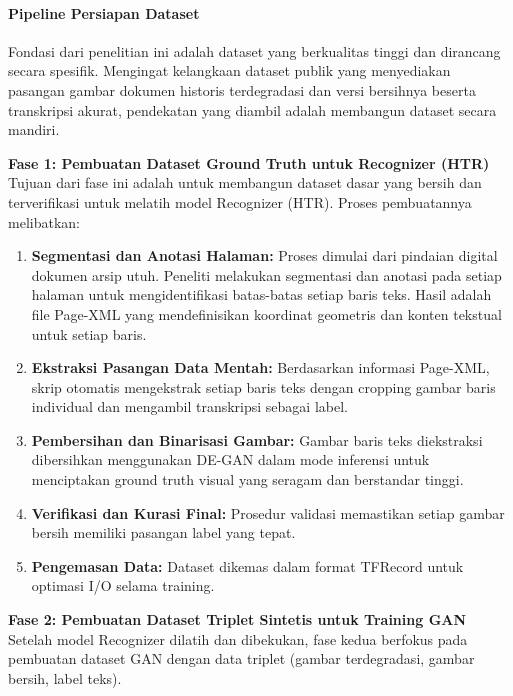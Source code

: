 \documentclass[12pt,a4paper]{article}
\begin{document}
\paragraph{Pipeline Persiapan Dataset}
Fondasi dari penelitian ini adalah dataset yang berkualitas tinggi dan dirancang secara spesifik. Mengingat kelangkaan dataset publik yang menyediakan pasangan gambar dokumen historis terdegradasi dan versi bersihnya beserta transkripsi akurat, pendekatan yang diambil adalah membangun dataset secara mandiri.

\textbf{Fase 1: Pembuatan Dataset Ground Truth untuk Recognizer (HTR)}
Tujuan dari fase ini adalah untuk membangun dataset dasar yang bersih dan terverifikasi untuk melatih model Recognizer (HTR). Proses pembuatannya melibatkan:

\begin{enumerate}
    \item \textbf{Segmentasi dan Anotasi Halaman:} Proses dimulai dari pindaian digital dokumen arsip utuh. Peneliti melakukan segmentasi dan anotasi pada setiap halaman untuk mengidentifikasi batas-batas setiap baris teks. Hasil adalah file Page-XML yang mendefinisikan koordinat geometris dan konten tekstual untuk setiap baris.

    \item \textbf{Ekstraksi Pasangan Data Mentah:} Berdasarkan informasi Page-XML, skrip otomatis mengekstrak setiap baris teks dengan cropping gambar baris individual dan mengambil transkripsi sebagai label.

    \item \textbf{Pembersihan dan Binarisasi Gambar:} Gambar baris teks diekstraksi dibersihkan menggunakan DE-GAN dalam mode inferensi untuk menciptakan ground truth visual yang seragam dan berstandar tinggi.

    \item \textbf{Verifikasi dan Kurasi Final:} Prosedur validasi memastikan setiap gambar bersih memiliki pasangan label yang tepat.

    \item \textbf{Pengemasan Data:} Dataset dikemas dalam format TFRecord untuk optimasi I/O selama training.
\end{enumerate}

\textbf{Fase 2: Pembuatan Dataset Triplet Sintetis untuk Training GAN}
Setelah model Recognizer dilatih dan dibekukan, fase kedua berfokus pada pembuatan dataset GAN dengan data triplet (gambar terdegradasi, gambar bersih, label teks).
\end{document}
